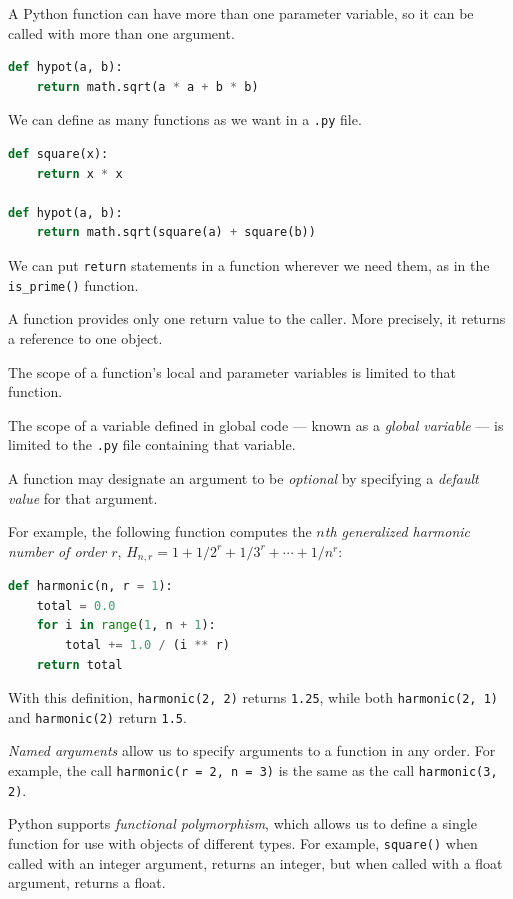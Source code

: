 \documentclass[8pt,a4paper,compress,handout]{beamer}
\begin{document}
\begin{frame}[fragile]
A Python function can have more than one parameter variable, so it can be called with more than one argument. 
\begin{lstlisting}[language=Python]
def hypot(a, b):
    return math.sqrt(a * a + b * b)
\end{lstlisting}

\bigskip

We can define as many functions as we want in a \lstinline{.py} file. 
\begin{lstlisting}[language=Python]
def square(x):
    return x * x

def hypot(a, b):
    return math.sqrt(square(a) + square(b))
\end{lstlisting}

\bigskip

We can put \lstinline{return} statements in a function wherever we need them, as in the \lstinline{is_prime()} function.

\bigskip

A function provides only one return value to the caller. More precisely, it returns a reference to one object.

\bigskip

The scope of a function's local and parameter variables is limited to that function.

\bigskip

The scope of a variable defined in global code --- known as a \emph{global variable} --- is limited to the \lstinline{.py} file containing that variable. 
\end{frame}

\begin{frame}[fragile]
A function may designate an argument to be \emph{optional} by specifying a \emph{default value} for that argument. 

\bigskip

For example, the following function computes the \emph{$n$th generalized harmonic number of order $r$}, $H_{n,r}=1+1/2^r+1/3^r+\cdots+1/n^r$:

\begin{lstlisting}[language=Python]
def harmonic(n, r = 1):
    total = 0.0
    for i in range(1, n + 1):
        total += 1.0 / (i ** r)
    return total
\end{lstlisting}
With this definition, \lstinline{harmonic(2, 2)} returns \lstinline{1.25}, while both \lstinline{harmonic(2, 1)} and \lstinline{harmonic(2)} return \lstinline{1.5}.

\bigskip

\emph{Named arguments} allow us to specify arguments to a function in any order. For example, the call \lstinline{harmonic(r = 2, n = 3)} is the same as the call \lstinline{harmonic(3, 2)}.

\bigskip

Python supports \emph{functional polymorphism}, which allows us to define a single function for use with objects of different types. For example, \lstinline{square()} when called with an integer argument, returns an integer, but when called with a float argument, returns a float.
\end{frame}
\end{document}
